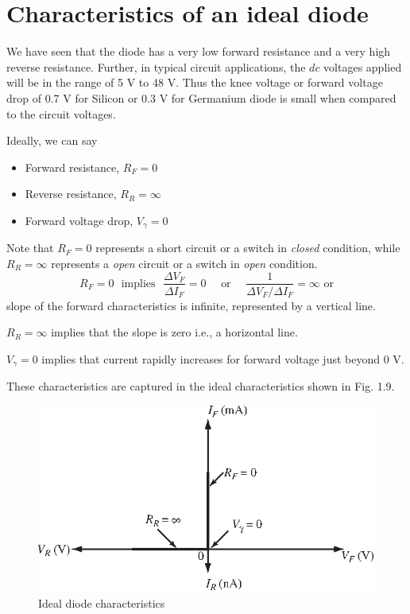 \section{Characteristics of an ideal diode}\label{sec1.12}

We have seen that the diode has a very low forward resistance and a
very high reverse resistance. Further, in typical circuit
applications, the $dc$ voltages applied will be in the range of 5 V to
48 V. Thus the knee voltage or forward voltage drop of 0.7 V for
Silicon or 0.3 V for Germanium diode is small when compared to the
circuit voltages.

Ideally, we can say
\begin{itemize}
\item Forward resistance, $R_F = 0$

\item Reverse resistance, $R_R = \infty$

\item Forward voltage drop, $V_\gamma = 0$
\end{itemize}

\vfill\eject

Note that $R_F = 0$ represents a short circuit or a switch in
\textit{closed} condition, while $R_R = \infty$ represents a
\textit{open} circuit or a switch in \textit{open} condition.
$$
R_F = 0 \text{~ implies ~} \frac{\Delta V_F}{\Delta I_F} = 0 \quad
\text{ or } \quad \frac{1}{\Delta V_F / \Delta I_F} = \infty \text{ or
}
$$
slope of the forward characteristics is infinite, represented by a
vertical line. 

$R_R  = \infty$ implies that the slope is zero i.e., a horizontal
line.

$V_\gamma =0$ implies that current rapidly increases for forward
voltage just beyond 0 V.

These characteristics are captured in the ideal characteristics shown
in Fig. 1.9.
\begin{figure}[H]
\centering
\includegraphics[scale=1.1]{chap1/S3-EE-01-016.eps}
\caption{Ideal diode characteristics}
\end{figure}


